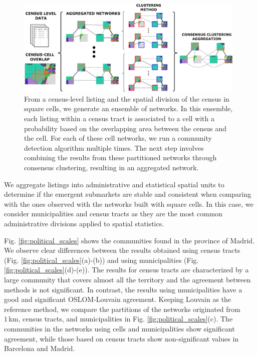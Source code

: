 \begin{figure}[t]
    \centering
    \includegraphics[width = 0.98\textwidth]{Figs/Idealista_segmentation/Census_cell_method.pdf}
	\caption[Stochastic aggregative method using census level data.]{ From a census-level listing and the spatial division of the census in square cells, we generate an ensemble of networks. In this ensemble, each listing within a census tract is associated to a cell with a probability based on the overlapping area between the census and the cell. For each of these cell networks, we run a community detection algorithm multiple times. The next step involves combining the results from these partitioned networks through consensus clustering, resulting in an aggregated network. \label{fig:stochastic_construction}}
\end{figure}

We aggregate listings into administrative and statistical spatial units to determine if the emergent submarkets are stable and consistent when comparing with the ones observed with the networks built with square cells. In this case, we consider municipalities and census tracts as they are the most common administrative divisions applied to spatial statistics. 

Fig. \ref{fig:political_scales} shows the communities found in the province of Madrid. We observe clear differences between the results obtained using census tracts (Fig. \ref{fig:political_scales}(a)-(b)) and using municipalities (Fig. \ref{fig:political_scales}(d)-(e)). The results for census tracts are characterized by a large community that covers almost all the territory and the agreement between methods is not significant. In contrast, the results using municipalities have a good and significant OSLOM-Louvain agreement. Keeping Louvain as the reference method, we compare the partitions of the networks originated from $1  \, \textrm{km}$, census tracts, and municipalities in Fig. \ref{fig:political_scales}(c). The communities in the networks using cells and municipalities show significant agreement, while those based on census tracts show non-significant values in Barcelona and Madrid.

